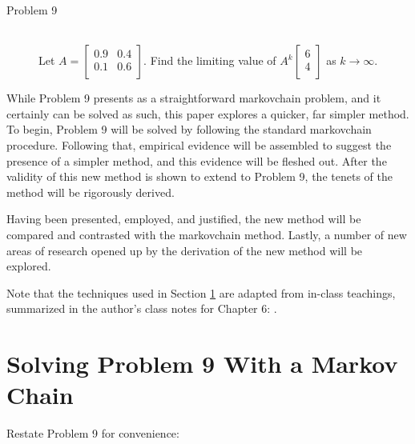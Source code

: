 \documentclass[titlepage]{article}
\begin{document}
\begin{prob}
    \begin{description}
        \item[Problem 9] \hfill \\ Let $
            A =
            \begin{bmatrix}
                0.9 & 0.4\\
                0.1 & 0.6\\
            \end{bmatrix}
        $. Find the limiting value of $
            A^k
            \begin{bmatrix}
                6\\
                4\\
            \end{bmatrix}
        $ as $k\to\infty$.
    \end{description}
\end{prob}

While Problem 9 presents as a straightforward \Gls{markovchain} problem, and it certainly can be solved as such, this paper explores a quicker, far simpler method. To begin, Problem 9 will be solved by following the standard \Gls{markovchain} procedure. Following that, empirical evidence will be assembled to suggest the presence of a simpler method, and this evidence will be fleshed out. After the validity of this new method is shown to extend to Problem 9, the tenets of the method will be rigorously derived.\par
Having been presented, employed, and justified, the new method will be compared and contrasted with the \Gls{markovchain} method. Lastly, a number of new areas of research opened up by the derivation of the new method will be explored.\par
Note that the techniques used in Section \ref{sse:markovchain} are adapted from in-class teachings, summarized in the author's class notes for Chapter 6: \cite{bib:ch6notes}.
\newpage



\section{Solving Problem 9 With a Markov Chain}\label{sse:markovchain}
Restate Problem 9 for convenience:
\end{document}
